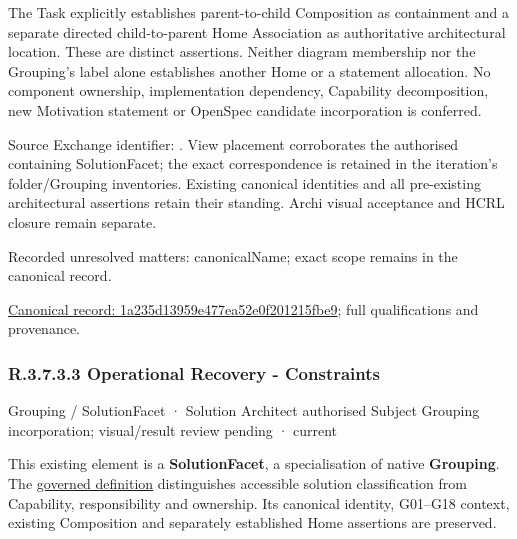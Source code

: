 The Task explicitly establishes parent-to-child Composition as containment and
a separate directed child-to-parent Home Association as authoritative architectural
location. These are distinct assertions. Neither diagram membership nor the
Grouping's label alone establishes another Home or a statement allocation.
No component ownership, implementation dependency, Capability decomposition,
new Motivation statement or OpenSpec candidate incorporation is conferred.



Source Exchange identifier: \texttt{}. View placement corroborates
the authorised containing SolutionFacet; the exact correspondence is retained in the
iteration's folder/Grouping inventories. Existing canonical identities and all
pre-existing architectural assertions retain their standing. Archi visual
acceptance and HCRL closure remain separate.


{\small Recorded unresolved matters: canonicalName; exact scope remains in the canonical record.}\par
{\footnotesize \href{../../../../../../../continuum/grouping/1a235d13959e477ea52e0f201215fbe9.md}{Canonical record: 1a235d13959e477ea52e0f201215fbe9}; full qualifications and provenance.}\par
\subsubsection*{R.3.7.3.3 Operational Recovery - Constraints}
\label{navigation:R.3.7.3.3}

\label{element:df0b38c3ba9c49ea8dfe3f032ad2a329}
{\small Grouping / SolutionFacet · Solution Architect authorised Subject Grouping incorporation; visual/result review pending · current}\par

This existing element is a \textbf{SolutionFacet}, a specialisation of native
\textbf{Grouping}. The \href{\detokenize{../../../../../../../governance/continuum-representation.md#solutionfacet-classification--1119-candidate}}{governed definition}
distinguishes accessible solution classification from Capability, responsibility
and ownership. Its canonical identity, G01–G18 context, existing Composition
and separately established Home assertions are preserved.



